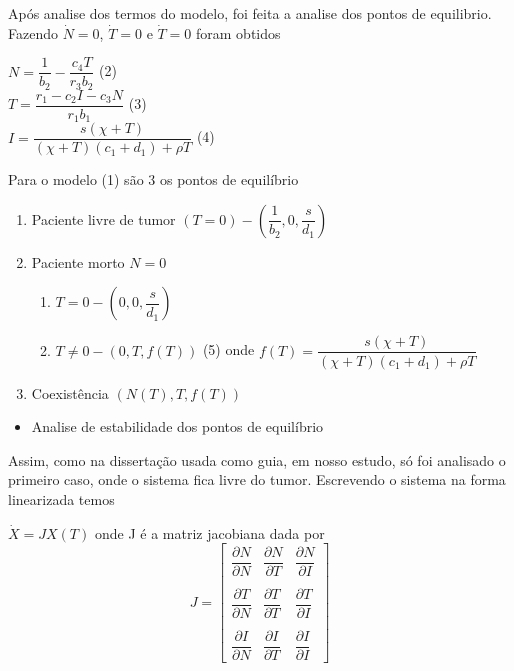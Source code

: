 \documentclass[12pt, a4paper]{article}
\begin{document}
Após analise dos termos do modelo, foi feita a analise dos pontos de equilibrio. Fazendo $\dot N = 0$, $\dot T = 0$ e $\dot T = 0$ foram obtidos 
\begin{center}
$N = \dfrac{1}{b_2} - \dfrac{c_4 T}{r_3 b_2}$ (2)\\
$T = \dfrac{r_1 - c_2 I - c_3 N}{r_1 b_1}$ (3) \\
$I = \dfrac{s(\chi + T)}{(\chi + T)(c_1 + d_1) + \rho T}$ (4)\\
\end{center}

Para o modelo (1) são 3 os pontos de equilíbrio\\

\begin{enumerate}
\item Paciente livre de tumor $(T = 0) - (\dfrac{1}{b_2}, 0, \dfrac{s}{d_1})$
\item Paciente morto $N = 0$
	\begin{enumerate}
		\item $T = 0 - (0,0, \dfrac{s}{d_1})$
		\item $T \neq 0 - (0, T, f(T))$ (5) onde $f(T) = \dfrac{s(\chi + T)}{(\chi + T)(c_1 + d_1) + \rho T}$
	\end{enumerate}
\item Coexistência $(N(T), T, f(T))$
\end{enumerate}

\begin{itemize}
\item Analise de estabilidade dos pontos de equilíbrio
\end{itemize}

Assim, como na dissertação usada como guia, em nosso estudo, só foi analisado o primeiro caso, onde o sistema fica livre do tumor. Escrevendo o sistema na forma linearizada temos

\begin{center}
$ \dot X = JX(T)$ onde J é a matriz jacobiana dada por\\
$$
J=
\left[ 
\begin{array}{ccc}
\dfrac{\partial N}{\partial N} & \dfrac{\partial N}{\partial T} & \dfrac{\partial N}{\partial I} \\ \\
\dfrac{\partial T}{\partial N} & \dfrac{\partial T}{\partial T} & \dfrac{\partial T}{\partial I} \\ \\
\dfrac{\partial I}{\partial N} & \dfrac{\partial I}{\partial T} & \dfrac{\partial I}{\partial I} 
\end{array}  
\right]
$$
\end{center}
\end{document}
